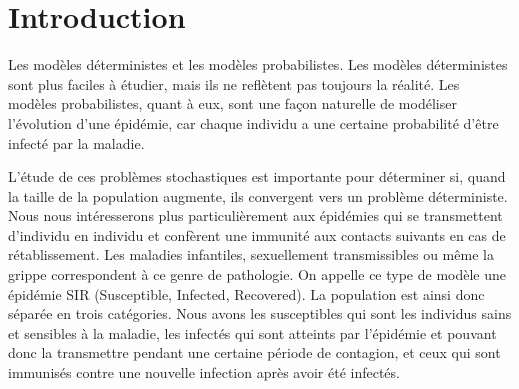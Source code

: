 \chapter{Introduction}

Les modèles déterministes et les modèles probabilistes. Les modèles déterministes sont plus faciles à étudier, mais ils ne reflètent pas toujours la réalité. Les modèles probabilistes, quant à eux, sont une façon naturelle de modéliser l’évolution d’une épidémie, car chaque individu a une certaine probabilité d’être infecté par la maladie.

L’étude de ces problèmes stochastiques est importante pour déterminer si, quand la taille de la population augmente, ils convergent vers un problème déterministe. Nous nous intéresserons plus particulièrement aux épidémies qui se transmettent d’individu en individu et confèrent une immunité aux contacts suivants en cas de rétablissement. Les maladies infantiles, sexuellement transmissibles ou même la grippe correspondent à ce genre de pathologie. On appelle ce type de modèle une épidémie SIR (Susceptible, Infected, Recovered). La population est ainsi donc séparée en trois catégories. Nous avons les susceptibles qui sont les individus sains et sensibles à la maladie, les infectés qui sont atteints par l’épidémie et pouvant donc la transmettre pendant une certaine période de contagion, et ceux qui sont immunisés contre une nouvelle infection après avoir été infectés.